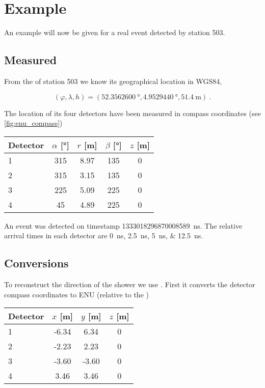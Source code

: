 \section{Example}
\label{sec:example}

An example will now be given for a real \hisparc event detected by
station 503.


\subsection{Measured}

From the \gps of station 503 we know its geographical location in WGS84,

\begin{equation}
    (\varphi, \lambda, h) = (\SI{52.3562600}{\degree},
                             \SI{4.9529440}{\degree},
                             \SI{51.4}{\meter}) \ .
\end{equation}

The location of its four detectors have been measured in compass
coordinates (see \cref{fig:enu_compass})

\begin{center}
    \begin{tabular}{ l c c c c }
        \toprule
        Detector & $\alpha$ [\si{\degree}] & $r$ [\si{\meter}] &
        $\beta$ [\si{\degree}] & $z$ [\si{\meter}] \\
        \midrule
        1 & 315 & 8.97 & 135 & 0 \\
        2 & 315 & 3.15 & 135 & 0 \\
        3 & 225 & 5.09 & 225 & 0 \\
        4 &  45 & 4.89 & 225 & 0 \\
        \bottomrule
    \end{tabular}
\end{center}

An event was detected on \gps timestamp
\SI{1333018296870008589}{\nano\second}. The relative arrival times in
each detector are \SIlist{0;2.5;5;12.5}{\nano\second}.


\subsection{Conversions}

To reconstruct the direction of the shower we use \sapphire. First it
converts the detector compass coordinates to ENU (relative to the \gps)

\begin{center}
    \begin{tabular}{ l c c c }
        \toprule
        Detector & $x$ [\si{\meter}] & $y$ [\si{\meter}] & $z$ [\si{\meter}] \\
        \midrule
        1 & -6.34 &  6.34 & 0 \\
        2 & -2.23 &  2.23 & 0 \\
        3 & -3.60 & -3.60 & 0 \\
        4 &  3.46 &  3.46 & 0 \\
        \bottomrule
    \end{tabular}
\end{center}

